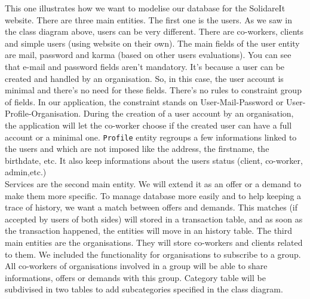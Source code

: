 This one illustrates how we want to modelise our database for the SolidareIt website. There are three main entities. The first one is the users. As we saw in the class diagram above, users can be very different. There are co-workers, clients and simple users (using website on their own). The main fields of the user entity are mail, password and karma (based on other users evaluations). You can see that e-mail and password fields aren't mandatory. It's because a user can be created and handled by an organisation. So, in this case, the user account is minimal and there's no need for these fields. There's no rules to constraint group of fields. In our application, the constraint stands on User-Mail-Password or User-Profile-Organisation. During the creation of a user account by an organisation, the application will let the co-worker choose if the created user can have a full account or a minimal one. \texttt{Profile} entity regroups a few informations linked to the users and which are not imposed like the address, the firstname, the birthdate, etc. It also keep informations about the users status (client, co-worker, admin,etc.)\\
Services are the second main entity. We will extend it as an offer or a demand to make them more specific. To manage database more easily and to help keeping a trace of history, we want a match between offers and demands. This matches (if accepted by users of both sides) will stored in a transaction table, and as soon as the transaction happened, the entities will move in an history table. 
The third main entities are the organisations. They will store co-workers and clients related to them. We included the functionality for organisations to subscribe to a group. All co-workers of organisations involved in a group will be able to share informations, offers or demands with this group. Category table will be subdivised in two tables to add subcategories specified in the class diagram.




